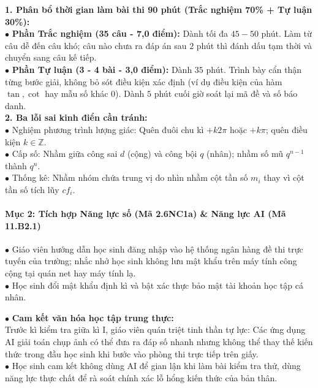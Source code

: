 \documentclass[12pt, a4paper]{article}
\begin{document}
\begin{scaffoldbox}
    \textbf{1. Phân bổ thời gian làm bài thi 90 phút (Trắc nghiệm 70\% + Tự luận 30\%):}\\
    $\bullet$ \textbf{Phần Trắc nghiệm (35 câu - 7,0 điểm):} Dành tối đa $45 - 50$ phút. Làm từ câu dễ đến câu khó; câu nào chưa ra đáp án sau $2$ phút thì đánh dấu tạm thời và chuyển sang câu kế tiếp.\\
    $\bullet$ \textbf{Phần Tự luận (3 - 4 bài - 3,0 điểm):} Dành $35$ phút. Trình bày cẩn thận từng bước giải, không bỏ sót điều kiện xác định (ví dụ điều kiện của hàm $\tan, \cot$ hay mẫu số khác $0$). Dành $5$ phút cuối giờ soát lại mã đề và số báo danh.\\
    \textbf{2. Ba lỗi sai kinh điển cần tránh:}\\
    $\bullet$ Nghiệm phương trình lượng giác: Quên đuôi chu kì $+ k2\pi$ hoặc $+ k\pi$; quên điều kiện $k \in \mathbb{Z}$.\\
    $\bullet$ Cấp số: Nhầm giữa công sai $d$ (cộng) và công bội $q$ (nhân); nhầm số mũ $q^{n-1}$ thành $q^n$.\\
    $\bullet$ Thống kê: Nhầm nhóm chứa trung vị do nhìn nhầm cột tần số $m_i$ thay vì cột tần số tích lũy $cf_i$.
\end{scaffoldbox}

\paragraph{Mục 2: Tích hợp Năng lực số (Mã 2.6NC1a) \& Năng lực AI (Mã 11.B2.1)}

\begin{pedabox}
    $\bullet$ Giáo viên hướng dẫn học sinh đăng nhập vào hệ thống ngân hàng đề thi trực tuyến của trường; nhắc nhở học sinh không lưu mật khẩu trên máy tính công cộng tại quán net hay máy tính lạ.\\
    $\bullet$ Học sinh đổi mật khẩu định kì và bật xác thực bảo mật tài khoản học tập cá nhân.
\end{pedabox}

\begin{aibox}
    $\bullet$ \textbf{Cam kết văn hóa học tập trung thực:}\\
    Trước kì kiểm tra giữa kì I, giáo viên quán triệt tinh thần tự lực: Các ứng dụng AI giải toán chụp ảnh có thể đưa ra đáp số nhanh nhưng không thể thay thế kiến thức trong đầu học sinh khi bước vào phòng thi trực tiếp trên giấy.\\
    $\bullet$ Học sinh cam kết không dùng AI để gian lận khi làm bài kiểm tra thử, dùng năng lực thực chất để rà soát chính xác lỗ hổng kiến thức của bản thân.
\end{aibox}
\end{document}
